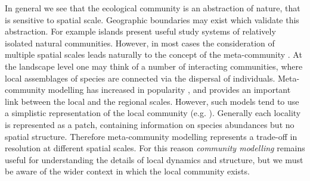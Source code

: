 In general we see that the ecological community is an abstraction of nature, that is sensitive to spatial scale. Geographic boundaries may exist which validate this abstraction. For example islands present useful study systems of relatively isolated natural communities. However, in most cases the consideration of multiple spatial scales leads naturally to the concept of the meta-community \cite{leibold2004metacommunity}. At the landscape level one may think of a number of interacting communities, where local assemblages of species are connected via the dispersal of individuals. Meta-community modelling has increased in popularity \cite{leibold2004metacommunity,logue2011empirical}, and provides an important link between the local and the regional scales. However, such models tend to use a simplistic representation of the local community (e.g. \cite{klausmeier2001habitat}). Generally each locality is represented as a patch, containing information on species abundances but no spatial structure. Therefore meta-community modelling represents a trade-off in resolution at different spatial scales. For this reason \emph{community modelling} remains useful for understanding the details of local dynamics and structure, but we must be aware of the wider context in which the local community exists. 








